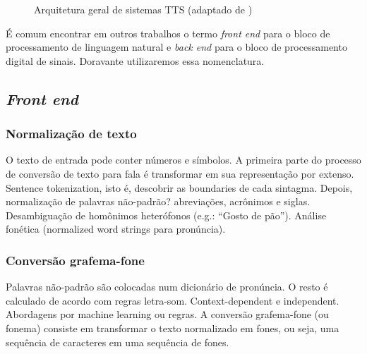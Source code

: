 \begin{figure}[!htbp]
\centering
{}
\caption{Arquitetura geral de sistemas TTS (adaptado de )}
\label{fig:tts-arch}
\end{figure}

É comum encontrar em outros trabalhos o termo \emph{front end} para o
bloco de processamento de linguagem natural e \emph{back end} para o bloco de
processamento digital de sinais. Doravante utilizaremos essa nomenclatura.

\subsection{\emph{Front end}}

\subsubsection{Normalização de texto}
O texto de entrada pode conter números e símbolos. A primeira parte do processo de conversão de texto para fala é transformar em sua representação por extenso.
Sentence tokenization, isto é, descobrir as boundaries de cada sintagma. Depois,
normalização de palavras não-padrão? abreviações, acrônimos e siglas.
Desambiguação de homônimos heterófonos (e.g.: ``Gosto de pão''). Análise
fonética (normalized word strings para pronúncia).

\subsubsection{Conversão grafema-fone}
Palavras não-padrão são colocadas num dicionário de pronúncia. O resto é
calculado de acordo com regras letra-som.
Context-dependent e independent. Abordagens por machine learning ou regras.
A conversão grafema-fone (ou fonema) consiste em transformar o texto normalizado
em fones, ou seja, uma sequência de caracteres em uma sequência de fones.

